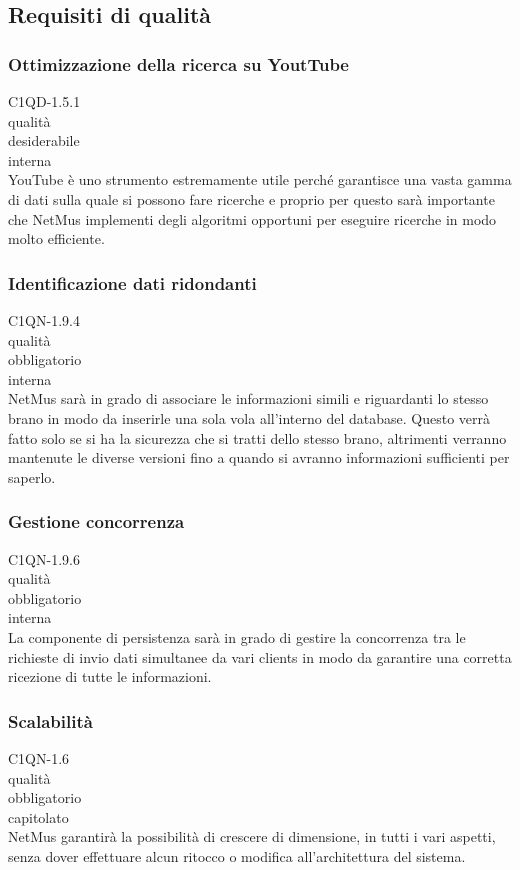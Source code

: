 \subsection{Requisiti di qualit\`a}

\subsubsection*{Ottimizzazione della ricerca su YoutTube}
 C1QD-1.5.1 \\
 qualit\`a \\
 desiderabile \\
 interna \\
YouTube \`e uno strumento estremamente utile perch\'e garantisce una vasta gamma
di dati sulla quale si possono fare ricerche e proprio per questo sar\`a
importante che NetMus implementi degli algoritmi opportuni per eseguire ricerche
in modo molto efficiente.

\subsubsection*{Identificazione dati ridondanti}
 C1QN-1.9.4 \\
 qualit\`a \\
 obbligatorio \\
 interna \\
NetMus sar\`a in grado di associare le informazioni simili e
riguardanti lo stesso brano in modo da inserirle una sola vola all'interno del
database. Questo verr\`a fatto solo se si ha la sicurezza che si tratti dello
stesso brano, altrimenti verranno mantenute le diverse versioni fino a quando si
avranno informazioni sufficienti per saperlo.

\subsubsection*{Gestione concorrenza}
 C1QN-1.9.6 \\
 qualit\`a \\
 obbligatorio \\
 interna \\
La componente di persistenza sar\`a in grado di gestire la concorrenza tra le
richieste di invio dati simultanee da vari clients in modo da garantire una
corretta ricezione di tutte le informazioni.

\subsubsection*{Scalabilit\`a}
 C1QN-1.6 \\
 qualit\`a \\
 obbligatorio \\
 capitolato \\
NetMus garantir\`a la possibilit\`a di crescere di dimensione, in tutti i vari
aspetti, senza dover effettuare alcun ritocco o modifica all'architettura del
sistema.

